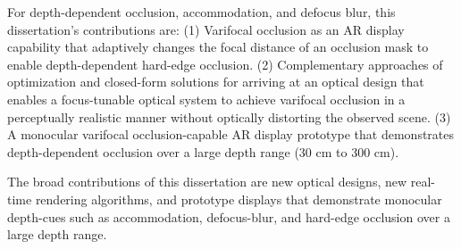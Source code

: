 For depth-dependent occlusion, accommodation, and defocus blur, this dissertation’s contributions are: 
(1) Varifocal occlusion as an AR display capability that adaptively changes the focal distance of an occlusion mask to enable depth-dependent hard-edge occlusion. 
(2) Complementary approaches of optimization and closed-form solutions for arriving at an optical design that enables a focus-tunable optical system to achieve varifocal occlusion in a perceptually realistic manner without optically distorting the observed scene. 
(3) A monocular varifocal occlusion-capable AR display prototype that demonstrates depth-dependent occlusion over a large depth range (30 cm to 300 cm). 

The broad contributions of this dissertation are new optical designs, new real-time rendering algorithms, and prototype displays that demonstrate monocular depth-cues such as accommodation, defocus-blur, and hard-edge occlusion over a large depth range. 


